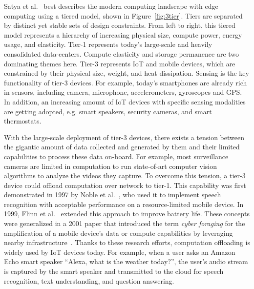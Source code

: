 Satya et al.~\cite{satya2019computing} best describes the modern computing
landscape with edge computing using a tiered model, shown in
Figure~\ref{fig:3tier}. Tiers are separated by distinct yet stable sets of
design constraints. From left to right, this tiered model represents a hierarchy
of increasing physical size, compute power, energy usage, and elasticity. Tier-1
represents today's large-scale and heavily consolidated data-centers. Compute
elasticity and storage permanence are two dominating themes here. Tier-3
represents IoT and mobile devices, which are constrained by their physical size,
weight, and heat dissipation. Sensing is the key functionality of tier-3
devices. For example, today's smartphones are already rich in sensors, including
camera, microphone, accelerometers, gyroscopes and GPS. In addition, an
increasing amount of IoT devices with specific sensing modalities are getting
adopted, e.g. smart speakers, security cameras, and smart thermostats. 

With the large-scale deployment of tier-3 devices, there exists a tension
between the gigantic amount of data collected and generated by them and their
limited capabilities to process these data on-board. For example, most
surveillance cameras are limited in computation to run state-of-art computer
vision algorithms to analyze the videos they capture. To overcome this tension,
a tier-3 device could offload computation over network to tier-1. This
capability was first demonstrated in 1997 by Noble et al.~\cite{Noble1997}, who
used it to implement speech recognition with acceptable performance on a
resource-limited mobile device. In 1999, Flinn et al.~\cite{Flinn1999} extended
this approach to improve battery life.  These concepts were generalized in a
2001 paper that introduced the term {\em cyber foraging} for the amplification
of a mobile device's data or compute capabilities by leveraging nearby
infrastructure~\cite{Satya2001}.  Thanks to these research efforts, computation
offloading is widely used by IoT devices today. For example, when a user asks an
Amazon Echo smart speaker ``Alexa, what is the weather today?'', the user's
audio stream is captured by the smart speaker and transmitted to the cloud for
speech recognition, text understanding, and question answering.

